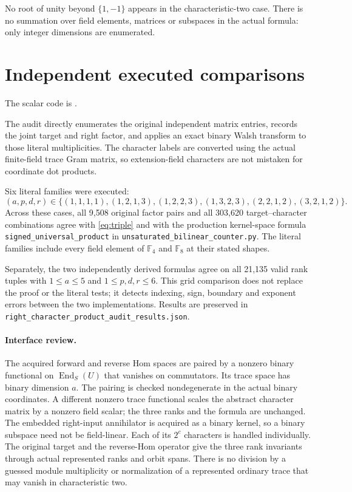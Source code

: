 \documentclass[11pt]{article}
\newcommand{\F}{\mathbb F}
\newcommand{\End}{\operatorname{End}}
\begin{document}
No root of unity beyond $\{1,-1\}$ appears in the characteristic-two
case. There is no summation over field elements, matrices or subspaces
in the actual formula: only integer dimensions are enumerated.

\section{Independent executed comparisons}

The scalar code is .

The audit  directly enumerates
the original independent matrix entries, records the joint target and
right factor, and applies an exact binary Walsh transform to those
literal multiplicities. The character labels are converted using the
actual finite-field trace Gram matrix, so extension-field characters
are not mistaken for coordinate dot products.

Six literal families were executed:
\[
 (a,p,d,r)\in\{(1,1,1,1),(1,2,1,3),(1,2,2,3),
 (1,3,2,3),(2,2,1,2),(3,2,1,2)\}.
\]
Across these cases, all 9,508 original factor pairs and all 303,620
target--character combinations agree with \eqref{eq:triple} and with
the production kernel-space formula
\texttt{signed\_universal\_product} in
\texttt{unsaturated\_bilinear\_counter.py}.
The literal families include every field element of $\F_4$ and $\F_8$
at their stated shapes.

Separately, the two independently derived formulas agree on all 21,135
valid rank tuples with $1\le a\le5$ and $1\le p,d,r\le6$.
This grid comparison does not replace the proof or the literal tests;
it detects indexing, sign, boundary and exponent errors between the
two implementations. Results are preserved in
\texttt{right\_character\_product\_audit\_results.json}.

\paragraph{Interface review.}
The acquired forward and reverse Hom spaces are paired by a
nonzero binary functional on
$\End_S(U)$ that vanishes on commutators. Its trace space has binary
dimension $a$. The pairing is checked nondegenerate in the actual
binary coordinates. A different nonzero trace functional scales the
abstract character matrix by a nonzero field scalar; the three ranks
and the formula are unchanged. The embedded right-input annihilator
is acquired as a binary kernel, so a binary subspace need not be
field-linear. Each of its $2^c$ characters is handled individually.
The original target and the reverse-Hom operator give the three
rank invariants through actual represented ranks and orbit spans.
There is no division by a guessed module multiplicity or normalization
of a represented ordinary trace that may vanish in characteristic two.
\end{document}
